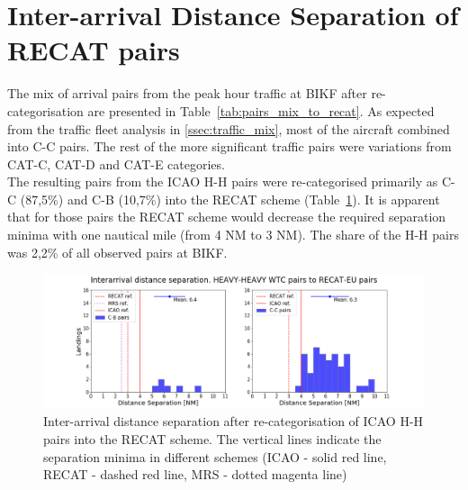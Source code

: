 \section{Inter-arrival Distance Separation of RECAT pairs}\label{sec:interarrival_dist_sep_RECAT}
The mix of arrival pairs from the peak hour traffic at BIKF after re-categorisation are presented in Table~\ref{tab:pairs_mix_to_recat}. As expected from the traffic fleet analysis in \ref{ssec:traffic_mix}, most of the aircraft combined into C-C pairs. The rest of the more significant traffic pairs were variations from CAT-C, CAT-D and CAT-E categories.\\
The resulting pairs from the ICAO H-H pairs were re-categorised primarily as C-C (87,5\%) and C-B (10,7\%) into the RECAT scheme (Table~\ref{fig:HH_to_RECAT_pairs_dist_separ}). It is apparent that for those pairs the RECAT scheme would decrease the required separation minima with one nautical mile (from 4 NM to 3 NM). The share of the H-H pairs was 2,2\% of all observed pairs at BIKF.
\begin{figure}[h]
    \centering
    \includegraphics[width=1\textwidth]{graphics/fig_HH_to_RECAT_pairs_dist_separ.png}
    \caption[Inter-arrival distance separation of ICAO H-H pairs into the RECAT scheme]{Inter-arrival distance separation after re-categorisation of ICAO H-H pairs into the RECAT scheme. The vertical lines indicate the separation minima in different schemes (ICAO - solid red line, RECAT - dashed red line, MRS - dotted magenta line)}
    \label{fig:HH_to_RECAT_pairs_dist_separ}
\end{figure}

